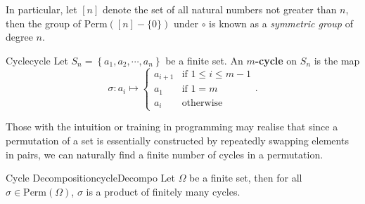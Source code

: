 \documentclass[math, code]{amznotes}
\theoremstyle{remark}
\begin{document}
In particular, let $[n]$ denote the set of all natural numbers not greater than $n$, then the group of $\mathrm{Perm}([n] - \{0\})$ under $\circ$ is known as a \textit{symmetric group} of degree $n$.
\begin{dfnbox}{Cycle}{cycle}
    Let $S_n = \left\{a_1, a_2, \cdots, a_n\right\}$ be a finite set. An {\color{red} \textbf{$m$-cycle}} on $S_n$ is the map
    \begin{equation*}
        \sigma \colon a_i \mapsto \begin{cases}
            a_{i + 1} & \textrm{if } 1 \leq i \leq m - 1 \\
            a_1 & \textrm{if } 1 = m \\
            a_i & \textrm{otherwise}
        \end{cases}.
    \end{equation*}
\end{dfnbox}
Those with the intuition or training in programming may realise that since a permutation of a set is essentially constructed by repeatedly swapping elements in pairs, we can naturally find a finite number of cycles in a permutation.
\begin{thmbox}{Cycle Decomposition}{cycleDecompo}
    Let $\Omega$ be a finite set, then for all $\sigma \in \mathrm{Perm}(\Omega)$, $\sigma$ is a product of finitely many cycles.
\end{thmbox}
\end{document}
